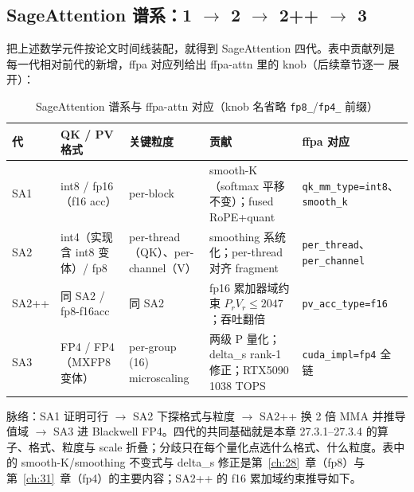 \subsection{SageAttention 谱系：1 $\to$ 2 $\to$ 2++ $\to$ 3}

把上述数学元件按论文时间线装配，就得到 SageAttention 四代。表中贡献列是
每一代相对前代的新增，ffpa 对应列给出 ffpa-attn 里的 knob（后续章节逐一
展开）：

\begin{table}[htbp]
  \centering
  \caption{SageAttention 谱系与 ffpa-attn 对应（knob 名省略 \texttt{fp8\_}/\texttt{fp4\_} 前缀）}
  \label{tab:27-sage}
  \begin{tabular}{p{1.2cm}p{2.1cm}p{2.5cm}p{3.2cm}p{2.9cm}}
    \toprule
    代 & QK / PV 格式 & 关键粒度 & 贡献 & ffpa 对应 \\
    \midrule
    SA1 & int8 / fp16（f16 acc） & per-block & smooth-K（softmax 平移不变）；fused RoPE+quant & {\footnotesize\texttt{qk\_mm\_type=int8}}、{\footnotesize\texttt{smooth\_k}} \\
    SA2 & int4（实现含 int8 变体）/ fp8 & per-thread（QK）、per-channel（V） & smoothing 系统化；per-thread 对齐 fragment & {\footnotesize\texttt{per\_thread}}、{\footnotesize\texttt{per\_channel}} \\
    SA2++ & 同 SA2 / fp8-f16acc & 同 SA2 & fp16 累加器域约束 $P_r V_r \le 2047$；吞吐翻倍 & {\footnotesize\texttt{pv\_acc\_type=f16}} \\
    SA3 & FP4 / FP4（MXFP8 变体） & per-group (16) microscaling & 两级 P 量化；delta\_s rank-1 修正；RTX5090 1038 TOPS & {\footnotesize\texttt{cuda\_impl=fp4}} 全链 \\
    \bottomrule
  \end{tabular}
\end{table}

脉络：SA1 证明可行 $\to$ SA2 下探格式与粒度 $\to$ SA2++ 换 2 倍
MMA 并推导值域 $\to$ SA3 进 Blackwell FP4。四代的共同基础就是本章 27.3.1--27.3.4
的算子、格式、粒度与 scale 折叠；分歧只在每个量化点选什么格式、什么粒度。表中的
smooth-K/smoothing 不变式与 delta\_s 修正是第~\ref{ch:28}~章（fp8）与
第~\ref{ch:31}~章（fp4）的主要内容；SA2++ 的 f16 累加域约束推导如下。

